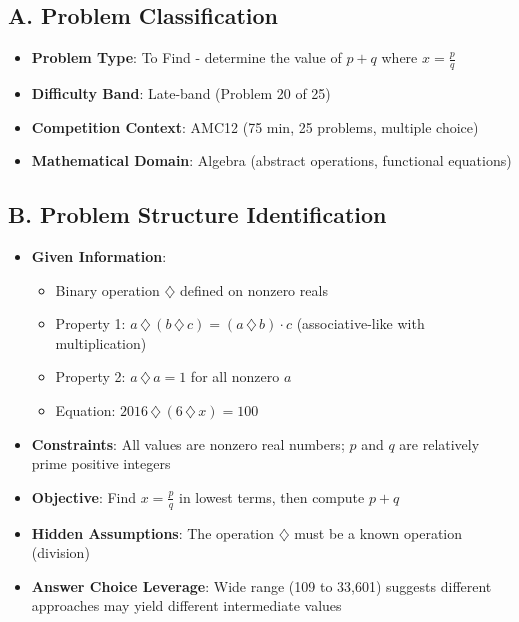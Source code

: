 \documentclass[11pt]{article}
\begin{document}
\begin{problemconfigbox}
\subsection*{A. Problem Classification}
\begin{itemize}[leftmargin=*]
    \item \textbf{Problem Type}: To Find - determine the value of $p+q$ where $x = \frac{p}{q}$
    \item \textbf{Difficulty Band}: Late-band (Problem 20 of 25)
    \item \textbf{Competition Context}: AMC12 (75 min, 25 problems, multiple choice)
    \item \textbf{Mathematical Domain}: Algebra (abstract operations, functional equations)
\end{itemize}

\subsection*{B. Problem Structure Identification}
\begin{itemize}[leftmargin=*]
    \item \textbf{Given Information}: 
    \begin{itemize}
        \item Binary operation $\diamondsuit$ defined on nonzero reals
        \item Property 1: $a\,\diamondsuit\, (b\,\diamondsuit \,c) = (a\,\diamondsuit \,b)\cdot c$ (associative-like with multiplication)
        \item Property 2: $a\,\diamondsuit \,a=1$ for all nonzero $a$
        \item Equation: $2016 \,\diamondsuit\, (6\,\diamondsuit\, x)=100$
    \end{itemize}
    \item \textbf{Constraints}: All values are nonzero real numbers; $p$ and $q$ are relatively prime positive integers
    \item \textbf{Objective}: Find $x = \frac{p}{q}$ in lowest terms, then compute $p+q$
    \item \textbf{Hidden Assumptions}: The operation $\diamondsuit$ must be a known operation (division)
    \item \textbf{Answer Choice Leverage}: Wide range (109 to 33,601) suggests different approaches may yield different intermediate values
\end{itemize}


\end{problemconfigbox}
\end{document}
